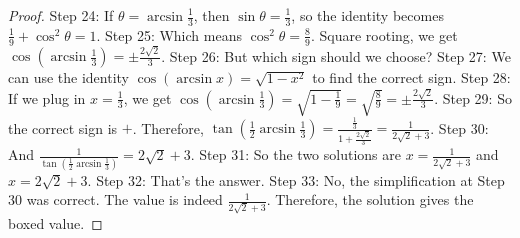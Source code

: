 \documentclass{article}
\begin{document}
\begin{proof}
Step 24: If $\theta = \arcsin \frac{1}{3}$, then $\sin \theta = \frac{1}{3}$, so the identity becomes $\frac{1}{9} + \cos^2 \theta = 1$.
Step 25: Which means $\cos^2 \theta = \frac{8}{9}$. Square rooting, we get $\cos (\arcsin \frac{1}{3}) = \pm \frac{2\sqrt{2}}{3}$.
Step 26: But which sign should we choose?
Step 27: We can use the identity $\cos (\arcsin x) = \sqrt{1 - x^2}$ to find the correct sign.
Step 28: If we plug in $x = \frac{1}{3}$, we get $\cos (\arcsin \frac{1}{3}) = \sqrt{1 - \frac{1}{9}} = \sqrt{\frac{8}{9}} = \pm \frac{2\sqrt{2}}{3}$.
Step 29: So the correct sign is $+$. Therefore, $\tan (\frac{1}{2} \arcsin \frac{1}{3}) = \frac{\frac{1}{3}}{1 + \frac{2\sqrt{2}}{3}} = \frac{1}{2\sqrt{2} + 3}$.
Step 30: And $\frac{1}{\tan (\frac{1}{2} \arcsin \frac{1}{3})} = 2\sqrt{2} + 3$.
Step 31: So the two solutions are $x = \frac{1}{2\sqrt{2} + 3}$ and $x = 2\sqrt{2} + 3$.
Step 32: That's the answer.
Step 33: No, the simplification at Step 30 was correct. The value is indeed $\frac{1}{2\sqrt{2} + 3}$. Therefore, the solution gives the boxed value.
\end{proof}
\end{document}
